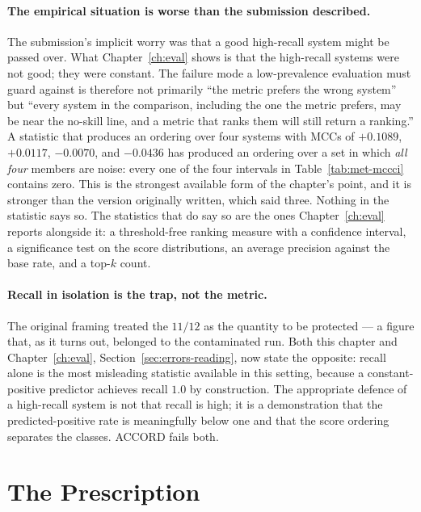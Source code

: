 \paragraph{The empirical situation is worse than the submission described.} The
submission's implicit worry was that a good high-recall system might be passed
over. What Chapter~\ref{ch:eval} shows is that the high-recall systems were not
good; they were constant. The failure mode a low-prevalence evaluation must
guard against is therefore not primarily ``the metric prefers the wrong system''
but ``every system in the comparison, including the one the metric prefers, may
be near the no-skill line, and a metric that ranks them will still return a
ranking.'' A statistic that produces an ordering over four systems with MCCs of
$+0.1089$, $+0.0117$, $-0.0070$, and $-0.0436$ has produced an ordering over a
set in which \emph{all four} members are noise: every one of the four intervals
in Table~\ref{tab:met-mccci} contains zero. This is the strongest available form
of the chapter's point, and it is stronger than the version originally written,
which said three. Nothing in the statistic says so. The
statistics that do say so are the ones Chapter~\ref{ch:eval} reports alongside
it: a threshold-free ranking measure with a confidence interval, a
significance test on the score distributions, an average precision against the
base rate, and a top-$k$ count.

\paragraph{Recall in isolation is the trap, not the metric.} The original
framing treated the $11/12$ as the quantity to be protected --- a figure that,
as it turns out, belonged to the contaminated run. Both this chapter and
Chapter~\ref{ch:eval}, Section~\ref{sec:errors-reading}, now state the opposite:
recall alone is the most misleading statistic available in this setting, because
a constant-positive predictor achieves recall $1.0$ by construction. The
appropriate defence of a high-recall system is not that recall is high; it is a
demonstration that the predicted-positive rate is meaningfully below one and
that the score ordering separates the classes. ACCORD fails both.

\section{The Prescription}
\label{sec:met-prescription}

